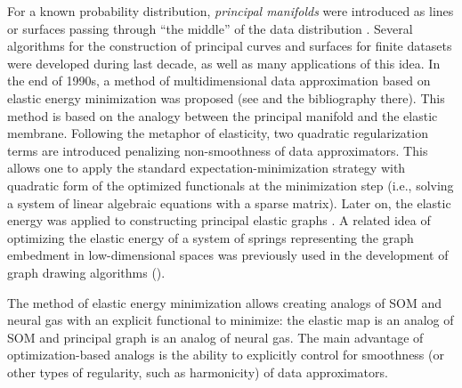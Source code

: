 \documentclass[graybox]{archivesofdatascience}
\begin{document}
For a known probability distribution, {\it principal manifolds} were
introduced as lines or surfaces passing through ``the middle'' of
the data distribution \citep{hastie1989}. Several  algorithms for
the construction of principal curves \citep{kegl2002} and surfaces for
finite datasets were developed during last decade, as well as many
applications of this idea. In the end of 1990s, a method of
multidimensional data approximation based on elastic energy
minimization was  proposed (see \citep{gorban1999neural,zinov2000,gorban2005elastic,Gorban2001ihespreprint,GorbanBook,GorbanHand} and the
bibliography there). This method is based on the analogy between the
principal manifold and the elastic membrane. Following
the metaphor of elasticity, two quadratic regularization terms are introduced
penalizing non-smoothness of data approximators.
This allows one to apply the standard expectation-minimization strategy
with quadratic form of the optimized functionals at the minimization step
(i.e., solving a system of linear algebraic equations with a sparse matrix).
Later on, the elastic energy was applied to constructing principal
elastic graphs \citep{gorban2007topological}. A related idea of optimizing the elastic energy of a system of springs representing
the graph embedment in low-dimensional spaces
was previously used in the development of graph drawing
algorithms (\cite{fruchterman1991graph,Kobourov2012}).

\iffalse
This intuitive vision
was transformed into the mathematical notion of {\it
self-consistency}: every point $x$ of the principal manifold $M$ is
a conditional expectation of all points $z$ that are projected into
$x$. Neither manifold, nor projection should be linear: just a
differentiable projection $\pi$ of the data space (usually it is
$R^m$ or a domain in $R^m$) onto the manifold $M$ with the
self-consistency requirement for conditional expectations: $
x=\mathbf{E}(z|\pi(z)=x).$ For a finite dataset $D$, only one or
zero data points are typically projected into a point of the
principal manifold. In order to avoid overfitting, we have to
introduce smoothers that become an essential part of the principal
manifold construction algorithms.


SOMs give one of the most popular approximations for principal manifolds:
we can take for $Y$ a fragment of a regular $k$-dimensional grid and
consider the resulting SOM as the approximation to the
$k$-dimensional principal manifold (see, for example,
\citep{Mulier95,Ritter92}).
\fi

The method of elastic energy minimization allows creating analogs of SOM \citep{kohonen1982self} and neural gas \citep{martinetz1993neural} with an explicit functional to minimize: the elastic map is an analog of SOM and principal graph is an analog of neural gas. The main advantage of optimization-based analogs is the ability to explicitly control for smoothness (or other types of regularity, such as harmonicity) of data approximators.
\end{document}
